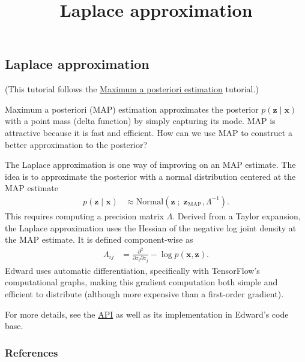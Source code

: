 \title{Laplace approximation}

\subsection{Laplace approximation}

(This tutorial follows the
\href{/tutorials/map}{Maximum a posteriori estimation} tutorial.)

Maximum a posteriori (MAP) estimation approximates the posterior $p(\mathbf{z} \mid \mathbf{x})$
with a point mass (delta function) by simply capturing its mode. MAP is
attractive because it is fast and efficient. How can we use MAP to construct a
better approximation to the posterior?

The Laplace approximation
\citep{laplace1986memoir}
is one way of improving on an MAP estimate. The idea
is to approximate the posterior with a normal distribution centered at the MAP
estimate
\begin{align*}
  p(\mathbf{z} \mid \mathbf{x})
  &\approx
  \text{Normal}(\mathbf{z}\;;\; \mathbf{z}_\text{MAP}, \Lambda^{-1}).
\end{align*}
This requires computing a precision matrix $\Lambda$. Derived from a
Taylor expansion, the Laplace approximation uses the Hessian of the
negative log joint density at the MAP estimate.  It is defined
component-wise as
\begin{align*}
  \Lambda_{ij}
  &=
  \frac{\partial^2}{\partial z_i \partial z_j} -\log p(\mathbf{x}, \mathbf{z}).
\end{align*}
Edward uses automatic differentiation, specifically with TensorFlow's
computational graphs, making this gradient computation both simple and
efficient to distribute (although more expensive than a first-order
gradient).

For more details, see the \href{/api/}{API} as well as its
implementation in Edward's code base.

\subsubsection{References}\label{references}

